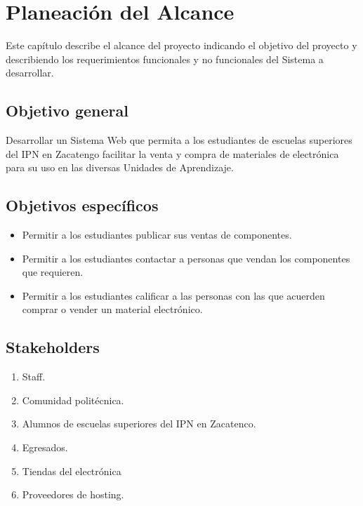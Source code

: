 \chapter{Planeación del Alcance}	
\label{cap:alcance}

	Este capítulo describe el alcance del proyecto indicando el objetivo del proyecto y describiendo los requerimientos funcionales y no funcionales del Sistema a desarrollar.

\section{Objetivo general}	

Desarrollar un Sistema Web que permita a los estudiantes de escuelas superiores del IPN en Zacatengo facilitar la venta y compra de materiales de electrónica para su uso en las diversas Unidades de Aprendizaje.

\section{Objetivos específicos}	

\begin{itemize}
	\item Permitir a los estudiantes publicar sus ventas de componentes.
	\item Permitir a los estudiantes contactar a personas que vendan los componentes que requieren.
	\item Permitir a los estudiantes calificar a las personas con las que acuerden comprar o vender un material electrónico.
\end{itemize}

\section{Stakeholders}
\begin{enumerate}
	\item Staff.
	\item Comunidad politécnica.
	\item Alumnos de escuelas superiores del IPN en Zacatenco.
	\item Egresados.
	\item Tiendas del electrónica
	\item Proveedores de hosting.
\end{enumerate}


